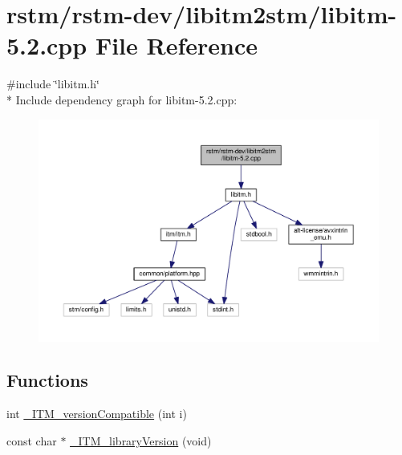 \hypertarget{libitm-5_82_8cpp}{\section{rstm/rstm-\/dev/libitm2stm/libitm-\/5.2.cpp File Reference}
\label{libitm-5_82_8cpp}
}
{\ttfamily \#include \char`\"{}libitm.\-h\char`\"{}}\\*
Include dependency graph for libitm-\/5.2.cpp\-:
\nopagebreak
\begin{figure}[H]
\begin{center}
\leavevmode
\includegraphics[width=350pt]{libitm-5_82_8cpp__incl}
\end{center}
\end{figure}
\subsection*{Functions}
\begin{DoxyCompactItemize}
\item 
int \hyperlink{libitm-5_82_8cpp_a2cbf07cd1964c625373b0ab62c5ec467}{\-\_\-\-I\-T\-M\-\_\-version\-Compatible} (int i)
\item 
const char $\ast$ \hyperlink{libitm-5_82_8cpp_aff5420399cc48ad1b0930bb60b44c50a}{\-\_\-\-I\-T\-M\-\_\-library\-Version} (void)
\end{DoxyCompactItemize}


